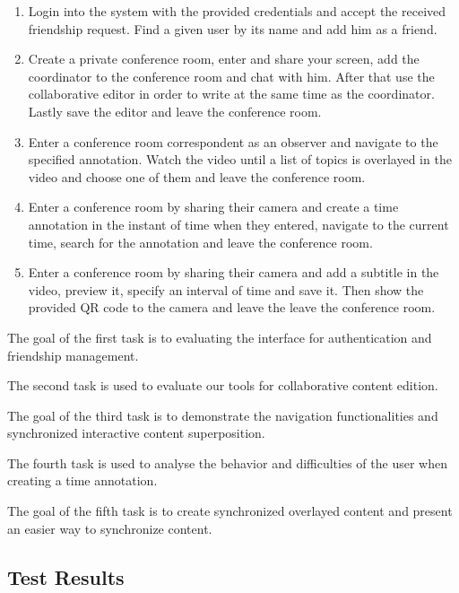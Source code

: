       \begin{enumerate}
      \item Login into the system with the provided credentials and accept the received friendship request. Find a given user by its name and add him as a friend.

      \item Create a private conference room, enter and share your screen, add the coordinator to the conference room and chat with him. After that use the collaborative editor in order to write at the same time as the coordinator. Lastly save the editor and leave the conference room.

      \item Enter a conference room correspondent as an observer and navigate to the specified annotation. Watch the video until a list of topics is overlayed in the video and choose one of them and leave the conference room.

      \item Enter a conference room by sharing their camera and create a time annotation in the instant of time when they entered, navigate to the current time, search for the annotation and leave the conference room.

      \item Enter a conference room by sharing their camera and add a subtitle in the video, preview it, specify an interval of time and save it. Then show the provided \ac{QR} code to the camera and leave the leave the conference room.
      \end{enumerate}

      The goal of the first task is to evaluating the interface for authentication and friendship management.

      The second task is used to evaluate our tools for collaborative content edition.

      The goal of the third task is to demonstrate the navigation functionalities and synchronized interactive content superposition.

      The fourth task is used to analyse the behavior and difficulties of the user when creating a time annotation.

      The goal of the fifth task is to create synchronized overlayed content and present an easier way to synchronize content.

  \subsection{Test Results}


